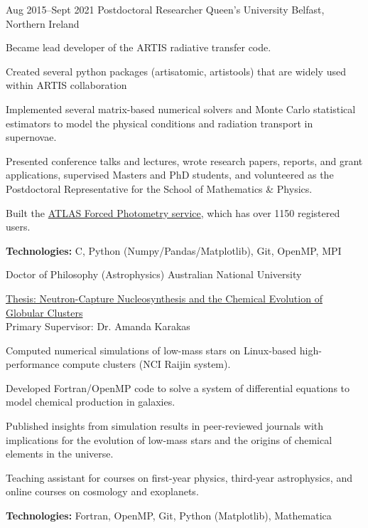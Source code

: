 \documentclass[11pt]{article} %
\begin{document}
\job
{Aug 2015--}{Sept 2021}
{Postdoctoral Researcher}
{}
{Queen's University Belfast, Northern Ireland}
{\begin{itemize-noindent}
\item{Became lead developer of the ARTIS radiative transfer code.}
\item{Created several python packages (artisatomic, artistools) that are widely used within ARTIS collaboration}
\item{Implemented several matrix-based numerical solvers and Monte Carlo statistical estimators to model the physical conditions and radiation transport in supernovae.}
\item{Presented conference talks and lectures, wrote research papers, reports, and grant applications, supervised Masters and PhD students, and volunteered as the Postdoctoral Representative for the School of Mathematics \& Physics.}
\item{Built the \href{https://fallingstar-data.com/forcedphot/}{ATLAS Forced Photometry service}, which has over 1150 registered users.}
\end{itemize-noindent}
\textbf{Technologies:} C, Python (Numpy/Pandas/Matplotlib), Git, OpenMP, MPI\\
}

{Doctor of Philosophy (Astrophysics)}
{}{Australian National University}
{
\href{https://openresearch-repository.anu.edu.au/handle/1885/16507}{Thesis: Neutron-Capture Nucleosynthesis and the Chemical Evolution of Globular Clusters}\\
Primary Supervisor: Dr. Amanda Karakas
\begin{itemize-noindent}
  \item Computed numerical simulations of low-mass stars on Linux-based high-performance compute clusters (NCI Raijin system).
  \item Developed Fortran/OpenMP code to solve a system of differential equations to model chemical production in galaxies.
  \item Published insights from simulation results in peer-reviewed journals with implications for the evolution of low-mass stars and the origins of chemical elements in the universe.
  \item Teaching assistant for courses on first-year physics, third-year astrophysics, and online courses on cosmology and exoplanets.
\end{itemize-noindent}
\textbf{Technologies:} Fortran, OpenMP, Git, Python (Matplotlib), Mathematica
}
\end{document}
